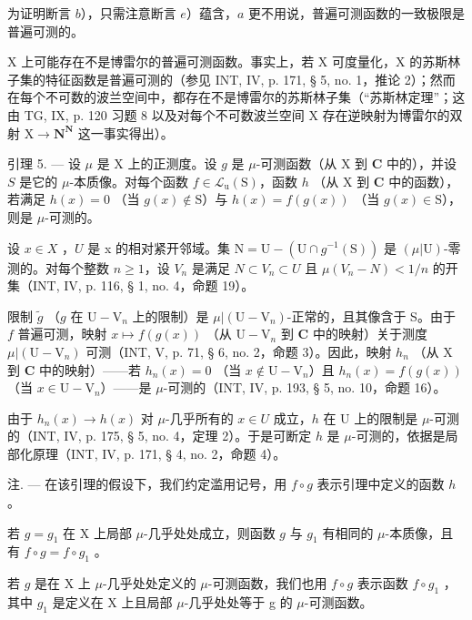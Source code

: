 为证明断言 \(b\)），只需注意断言 \(e\)）蕴含，\(a\) 更不用说，普遍可测函数的一致极限是普遍可测的。

X 上可能存在不是博雷尔的普遍可测函数。事实上，若 X 可度量化，X 的苏斯林子集的特征函数是普遍可测的（参见 INT, IV, p. 171, § 5, no. 1，推论 2）；然而在每个不可数的波兰空间中，都存在不是博雷尔的苏斯林子集（“苏斯林定理”；这由 TG, IX, p. 120 习题 8 以及对每个不可数波兰空间 X 存在逆映射为博雷尔的双射 \(\mathrm{X}\to\mathbf{N}^{\mathbf{N}}\) 这一事实得出）。

引理 5. --- 设 \(\mu\) 是 X 上的正测度。设 \(g\) 是 \(\mu\)-可测函数（从 X 到 \(\mathbf{C}\) 中的），并设 \(S\) 是它的 \(\mu\)-本质像。对每个函数 \(f \in \mathcal{L}_{\mathrm{u}}(\mathrm{S})\)，函数 \(h\) （从 X 到 \(\mathbf{C}\) 中的函数），若满足 \(h(x) = 0\) （当 \(g(x) \notin \mathrm{S}\)）与 \(h(x) = f(g(x))\) （当 \(g(x) \in \mathrm{S}\)），则是 \(\mu\)-可测的。

设 \(x \in X\) ，\(U\) 是 x 的相对紧开邻域。集 \(\mathrm{N} = \mathrm{U} - (\mathrm{U} \cap g^{-1}(\mathrm{S}))\) 是 \((\mu|\mathrm{U})\)-零测的。对每个整数 \(n \geqslant 1\)，设 \(V_{n}\) 是满足 \(N \subset V_{n} \subset U\) 且 \(\mu(V_{n} - N) < 1/n\) 的开集（INT, IV, p. 116, § 1, no. 4，命题 19）。

限制 \(\widetilde{g}\) （\(g\) 在 \(\mathrm{U}-\mathrm{V}_n\) 上的限制）是 \(\mu|(\mathrm{U}-\mathrm{V}_n)\)-正常的，且其像含于 S。由于 \(f\) 普遍可测，映射 \(x\mapsto f(g(x))\) （从 \(\mathrm{U}-\mathrm{V}_n\) 到 \(\mathbf{C}\) 中的映射）关于测度 \(\mu|(\mathrm{U}-\mathrm{V}_n)\) 可测（INT, V, p. 71, § 6, no. 2，命题 3）。因此，映射 \(h_n\) （从 X 到 \(\mathbf{C}\) 中的映射）——若 \(h_n(x) = 0\) （当 \(x\notin \mathrm{U}-\mathrm{V}_n\)）且 \(h_n(x) = f(g(x))\) （当 \(x\in \mathrm{U}-\mathrm{V}_n\)）——是 \(\mu\)-可测的（INT, IV, p. 193, § 5, no. 10，命题 16）。

由于 \(h_{n}(x) \to h(x)\) 对 \(\mu\)-几乎所有的 \(x \in U\) 成立，\(h\) 在 U 上的限制是 \(\mu\)-可测的（INT, IV, p. 175, § 5, no. 4，定理 2）。于是可断定 \(h\) 是 \(\mu\)-可测的，依据是局部化原理（INT, IV, p. 171, § 4, no. 2，命题 4）。

注. --- 在该引理的假设下，我们约定滥用记号，用 \(f \circ g\) 表示引理中定义的函数 \(h\) 。

若 \(g = g_{1}\) 在 X 上局部 \(\mu\)-几乎处处成立，则函数 \(g\) 与 \(g_{1}\) 有相同的 \(\mu\)-本质像，且有 \(f \circ g = f \circ g_{1}\) 。

若 \(g\) 是在 X 上 \(\mu\)-几乎处处定义的 \(\mu\)-可测函数，我们也用 \(f \circ g\) 表示函数 \(f \circ g_{1}\) ，其中 \(g_{1}\) 是定义在 X 上且局部 \(\mu\)-几乎处处等于 g 的 \(\mu\)-可测函数。

